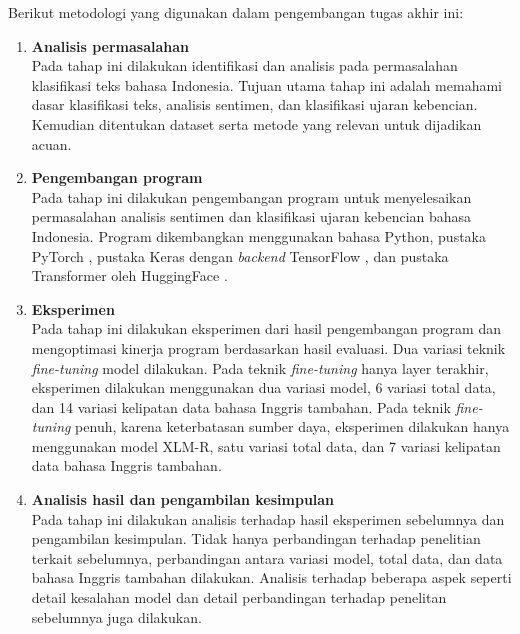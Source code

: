 Berikut metodologi yang digunakan dalam pengembangan tugas akhir ini:
\begin{enumerate}
	\item \textbf{Analisis permasalahan} \\
	Pada tahap ini dilakukan identifikasi dan analisis pada permasalahan klasifikasi teks bahasa Indonesia. Tujuan utama tahap ini adalah memahami dasar klasifikasi teks, analisis sentimen, dan klasifikasi ujaran kebencian. Kemudian ditentukan dataset serta metode yang relevan untuk dijadikan acuan.

	\item \textbf{Pengembangan program} \\
	Pada tahap ini dilakukan pengembangan program untuk menyelesaikan permasalahan analisis sentimen dan klasifikasi ujaran kebencian bahasa Indonesia. Program dikembangkan menggunakan bahasa Python, pustaka PyTorch \parencite{paszke2017automatic}, pustaka Keras \parencite{chollet2015keras} dengan \textit{backend} TensorFlow \parencite{tensorflow2015}, dan pustaka Transformer oleh HuggingFace \parencite{Wolf_Debut_Sanh_Chaumond_Delangue_Moi_Cistac_Rault_Louf_Funtowicz}.

	\item \textbf{Eksperimen} \\
	Pada tahap ini dilakukan eksperimen dari hasil pengembangan program dan mengoptimasi kinerja program berdasarkan hasil evaluasi. Dua variasi teknik \textit{fine-tuning} model dilakukan. Pada teknik \textit{fine-tuning} hanya layer terakhir, eksperimen dilakukan menggunakan dua variasi model, 6 variasi total data, dan 14 variasi kelipatan data bahasa Inggris tambahan. Pada teknik \textit{fine-tuning} penuh, karena keterbatasan sumber daya, eksperimen dilakukan hanya menggunakan model XLM-R, satu variasi total data, dan 7 variasi kelipatan data bahasa Inggris tambahan.
	
	\item \textbf{Analisis hasil dan pengambilan kesimpulan} \\
	Pada tahap ini dilakukan analisis terhadap hasil eksperimen sebelumnya dan pengambilan kesimpulan. Tidak hanya perbandingan terhadap penelitian terkait sebelumnya, perbandingan antara variasi model, total data, dan data bahasa Inggris tambahan dilakukan. Analisis terhadap beberapa aspek seperti detail kesalahan model dan detail perbandingan terhadap penelitan sebelumnya juga dilakukan.

\end{enumerate}

